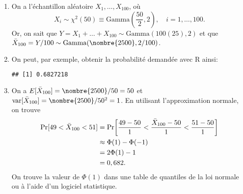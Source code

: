 \begin{solution}{2.18}
    \begin{enumerate}
    \item On a l'échantillon aléatoire $X_1, \dots, X_{100}$, où
      \begin{equation*}
        X_i \sim \chi^2(50) \equiv
        \text{Gamma}\left( \frac{50}{2},  2 \right), \quad
        i = 1, \dots, 100.
      \end{equation*}
      Or, on sait que $Y = X_1 + \dots + X_{100} \sim \text{Gamma}(100
      (25), 2)$ et que $\bar{X}_{100} = Y/100 \sim
      \text{Gamma}(\nombre{2500}, 2/100)$.
    \item On peut, par exemple, obtenir la probabilité demandée avec
      \textsf{R} ainsi:
\begin{knitrout}
\color{fgcolor}\begin{kframe}
\begin{alltt}
\hlstd{(}\hlstd{,} \hlstd{,} \hlstd{)} \hlopt{-} \hlstd{(}\hlstd{,} \hlstd{,} \hlstd{)}
\end{alltt}
\begin{verbatim}
## [1] 0.6827218
\end{verbatim}
\end{kframe}
\end{knitrout}
    \item On a $\esp{\bar{X}_{100}} = \nombre{2500}/50 = 50$ et
      $\var{\bar{X}_{100}} = \nombre{2500}/50^2 = 1$. En utilisant
      l'approximation normale, on trouve
      \begin{align*}
        \mathrm{Pr} [ 49 < \bar{X}_{100} < 51 ]
        &= \mathrm{Pr}\! \left[ \frac{49 - 50}{1} <
          \frac{\bar{X}_{100} - 50}{1} <
          \frac{51 - 50}{1} \right] \\
        &\approx \Phi(1) - \Phi(-1) \\
        &= 2\Phi(1) - 1 \\
        &= 0,682.
      \end{align*}
      On trouve la valeur de $\Phi(1)$ dans une table de quantiles de
      la loi normale ou à l'aide d'un logiciel statistique.
    \end{enumerate}
  
\end{solution}
